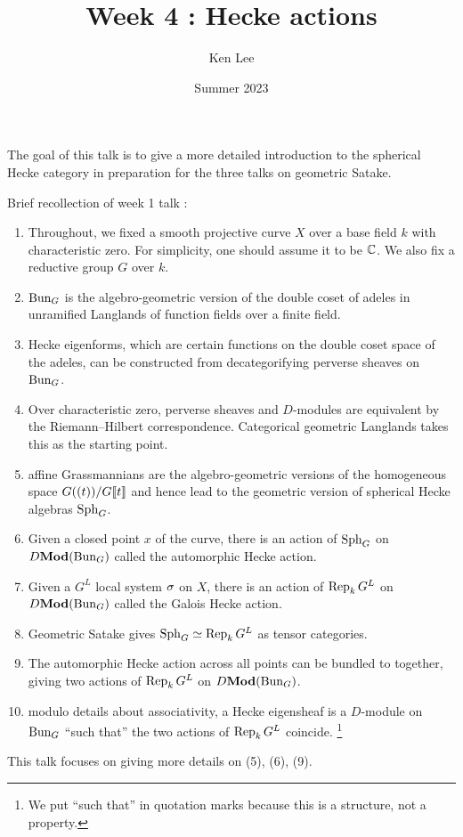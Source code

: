 \documentclass{article}
\begin{document}
\title{Week 4 : Hecke actions}

\author{Ken Lee}
\date{Summer 2023}
\maketitle

The goal of this talk is to give a more detailed introduction
to the spherical Hecke category in preparation for the
three talks on geometric Satake.

Brief recollection of week 1 talk : 
\begin{enumerate}
  \item Throughout, we fixed a smooth projective curve $X$ over
  a base field $k$ with characteristic zero.
  For simplicity, one should assume it to be $\mathbb{C}$.
  We also fix a reductive group $G$ over $k$.
  \item $\operatorname{Bun}_G$ is the algebro-geometric version of the
  double coset of adeles in 
  unramified Langlands of function fields over a finite field.
  \item Hecke eigenforms, 
  which are certain functions on the double coset space of the adeles,
  can be constructed from decategorifying 
  perverse sheaves on $\operatorname{Bun}_G$.
  \item Over characteristic zero, perverse sheaves and $D$-modules are
  equivalent by the Riemann--Hilbert correspondence.
  Categorical geometric Langlands takes this as the starting point.
  \item affine Grassmannians are the algebro-geometric versions of
  the homogeneous space $G((t)) / G\llbracket t \rrbracket$
  and hence lead to the geometric version of spherical Hecke algebras $\operatorname{Sph}_G$.
  \item Given a closed point $x$ of the curve,
  there is an action of $\operatorname{Sph}_G$ on $D\mathbf{Mod}(\operatorname{Bun}_G)$ called the
  automorphic Hecke action.
  \item Given a $G^L$ local system $\sigma$ on $X$,
  there is an action of $\operatorname{Rep}_k G^L$ on $D\mathbf{Mod}(\operatorname{Bun}_G)$
  called the Galois Hecke action.
  \item Geometric Satake gives $\operatorname{Sph}_G \simeq \operatorname{Rep}_k G^L$
  as tensor categories.
  \item The automorphic Hecke action across all points can be
  bundled to together, giving two actions of $\operatorname{Rep}_k G^L$
  on $D\mathbf{Mod}(\operatorname{Bun}_G)$.
  \item modulo details about associativity,
  a Hecke eigensheaf is a $D$-module on $\operatorname{Bun}_G$
  ``such that'' the two actions of $\operatorname{Rep}_k G^L$ coincide.
  \footnote{
    We put ``such that'' in quotation marks because
    this is a structure, not a property.
  }
\end{enumerate}
This talk focuses on giving more details on
(5), (6), (9).
\end{document}
